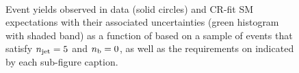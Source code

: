 \begin{figure}[h!]
\begin{center}
    \\
    \caption{Event yields observed in data (solid circles) and CR-fit SM expectations with their associated uncertainties (green histogram with shaded band) as a function of \HTmiss based on a sample of events that satisfy $n_{\text{jet}} = 5$ and $n_{\text{b}} = 0$, as well as the requirements on \scalht indicated by each sub-figure caption. }
    \label{fig:mhtdim_eq5j_eq0b}
  \end{center}
\end{figure}

